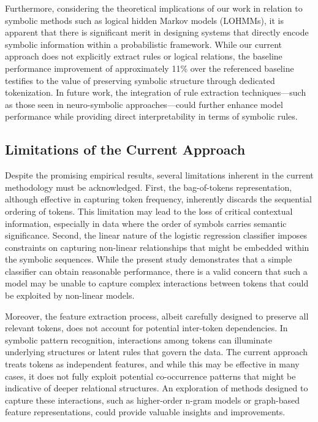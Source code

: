 \documentclass{article}
\begin{document}
Furthermore, considering the theoretical implications of our work in relation to symbolic methods such as logical hidden Markov models (LOHMMs), it is apparent that there is significant merit in designing systems that directly encode symbolic information within a probabilistic framework. While our current approach does not explicitly extract rules or logical relations, the baseline performance improvement of approximately 11\% over the referenced baseline testifies to the value of preserving symbolic structure through dedicated tokenization. In future work, the integration of rule extraction techniques—such as those seen in neuro-symbolic approaches—could further enhance model performance while providing direct interpretability in terms of symbolic rules.

\subsection*{Limitations of the Current Approach}
Despite the promising empirical results, several limitations inherent in the current methodology must be acknowledged. First, the bag-of-tokens representation, although effective in capturing token frequency, inherently discards the sequential ordering of tokens. This limitation may lead to the loss of critical contextual information, especially in data where the order of symbols carries semantic significance. Second, the linear nature of the logistic regression classifier imposes constraints on capturing non-linear relationships that might be embedded within the symbolic sequences. While the present study demonstrates that a simple classifier can obtain reasonable performance, there is a valid concern that such a model may be unable to capture complex interactions between tokens that could be exploited by non-linear models.

Moreover, the feature extraction process, albeit carefully designed to preserve all relevant tokens, does not account for potential inter-token dependencies. In symbolic pattern recognition, interactions among tokens can illuminate underlying structures or latent rules that govern the data. The current approach treats tokens as independent features, and while this may be effective in many cases, it does not fully exploit potential co-occurrence patterns that might be indicative of deeper relational structures. An exploration of methods designed to capture these interactions, such as higher-order n-gram models or graph-based feature representations, could provide valuable insights and improvements.
\end{document}
